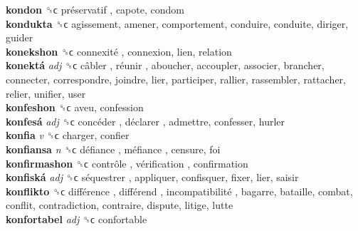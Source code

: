 \textbf{kondon} ␝ϲ   préservatif , capote, condom  \\
\textbf{kondukta} ␝ϲ  agissement, amener, comportement, conduire, conduite, diriger, guider  \\
\textbf{konekshon} ␝ϲ   connexité , connexion, lien, relation  \\
\textbf{konektá} \emph{adj}  ␝ϲ   câbler ,  réunir , aboucher, accoupler, associer, brancher, connecter, correspondre, joindre, lier, participer, rallier, rassembler, rattacher, relier, unifier, user  \\
\textbf{konfeshon} ␝ϲ  aveu, confession  \\
\textbf{konfesá} \emph{adj}  ␝ϲ   concéder ,  déclarer , admettre, confesser, hurler  \\
\textbf{konfia} \emph{v}  ␝ϲ  charger, confier  \\
\textbf{konfiansa} \emph{n}  ␝ϲ   défiance ,  méfiance , censure, foi  \\
\textbf{konfirmashon} ␝ϲ   contrôle ,  vérification , confirmation  \\
\textbf{konfiská} \emph{adj}  ␝ϲ   séquestrer , appliquer, confisquer, fixer, lier, saisir  \\
\textbf{konflikto} ␝ϲ   différence ,  différend ,  incompatibilité , bagarre, bataille, combat, conflit, contradiction, contraire, dispute, litige, lutte  \\
\textbf{konfortabel} \emph{adj}  ␝ϲ  confortable  \\
